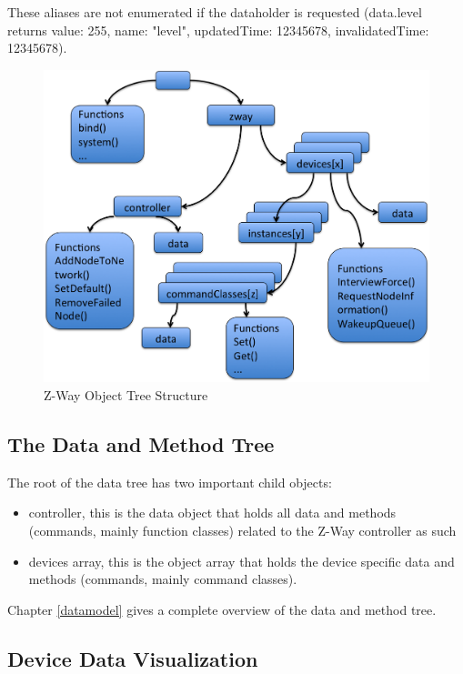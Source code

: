 These aliases are not enumerated if the dataholder is requested (data.level returns 
{value: 255, name: "level", 
updatedTime: 12345678, invalidatedTime: 12345678}).


\begin{figure} 
\begin{center}
\includegraphics[scale=0.6]{pics/zwayblocks.png}
\caption{Z-Way Object Tree Structure}
\label{zwaystructure} 
\end{center} 
\end{figure} 
 
\subsection {The Data and Method Tree}
 
The root of the data tree has two important child objects:
\begin{itemize}
\item controller, this is the data object that holds all data and methods (commands,  mainly function classes) 
related to the Z-Way controller as such
\item devices array, this is the object array that holds the device specific data and methods (commands, 
mainly command classes). 
\end {itemize}

Chapter \ref{datamodel} gives a complete overview of the data and method tree.

\subsection {Device Data Visualization}

